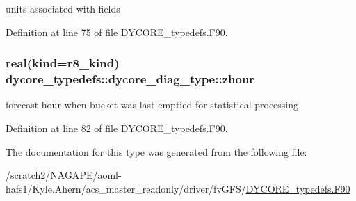 units associated with fields 



Definition at line 75 of file D\-Y\-C\-O\-R\-E\-\_\-typedefs.\-F90.

\subsubsection[{zhour}]{\setlength{\rightskip}{0pt plus 5cm}real(kind=r8\-\_\-kind) dycore\-\_\-typedefs\-::dycore\-\_\-diag\-\_\-type\-::zhour}\label{structdycore__typedefs_1_1dycore__diag__type_a2fd3a19561d5756ba91a8ca4d7f07986}


forecast hour when bucket was last emptied for statistical processing 



Definition at line 82 of file D\-Y\-C\-O\-R\-E\-\_\-typedefs.\-F90.



The documentation for this type was generated from the following file\-:\begin{DoxyCompactItemize}
\item 
/scratch2/\-N\-A\-G\-A\-P\-E/aoml-\/hafs1/\-Kyle.\-Ahern/acs\-\_\-master\-\_\-readonly/driver/fv\-G\-F\-S/\hyperlink{DYCORE__typedefs_8F90}{D\-Y\-C\-O\-R\-E\-\_\-typedefs.\-F90}\end{DoxyCompactItemize}
